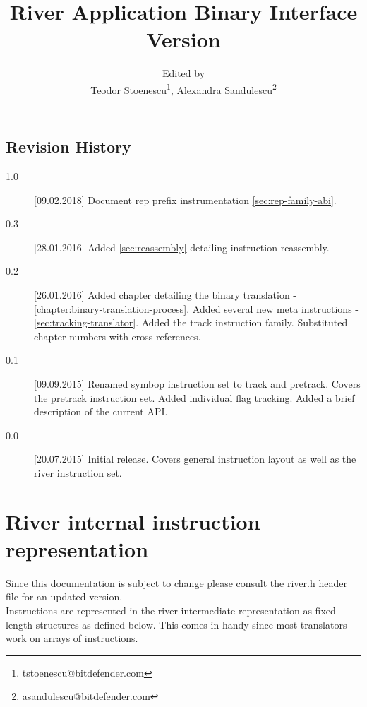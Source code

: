 \documentclass[12pt]{report}
\begin{document}
\author{Edited by\\
  Teodor Stoenescu\thanks{tstoenescu@bitdefender.com},
  Alexandra Sandulescu\thanks{asandulescu@bitdefender.com}}

\title{River Application Binary Interface\\
Version \version}
\maketitle
\tableofcontents

\section*{Revision History}

\begin{description}
	\item[1.0][09.02.2018] Document rep prefix instrumentation \autoref{sec:rep-family-abi}.
\item[0.3][28.01.2016] Added \autoref{sec:reassembly} detailing instruction reassembly.
\item[0.2][26.01.2016] Added chapter detailing the binary translation - \autoref{chapter:binary-translation-process}.
Added several new meta instructions - \autoref{sec:tracking-translator}.
Added the track instruction family.
Substituted chapter numbers with cross references.
\item[0.1][09.09.2015] Renamed symbop instruction set to track and pretrack.
Covers the pretrack instruction set.
Added individual flag tracking.
Added a brief description of the current API.
\item[0.0][20.07.2015] Initial release. Covers general instruction layout as well as the river instruction set.
\end{description}

\chapter{River internal instruction representation}
Since this documentation is subject to change please consult the river.h header file for an updated version.\\
Instructions are represented in the river intermediate representation as fixed length structures as defined below. This comes in handy since most translators work on arrays of instructions.


\end{document}
